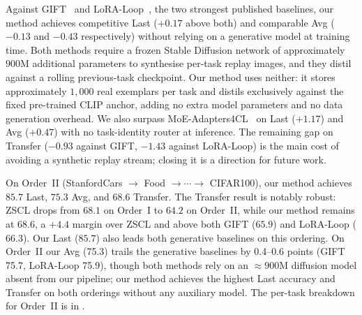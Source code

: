 \documentclass{article}
\begin{document}
  Against GIFT~\citep{gift2025} and LoRA-Loop~\citep{loraloop2025}, the two
  strongest published baselines, our method achieves competitive Last ($+0.17$
  above both) and comparable Avg ($-0.13$ and $-0.43$ respectively) without
  relying on a generative model at training time. Both methods require a frozen
  Stable Diffusion network of approximately $900$M additional parameters to
  synthesise per-task replay images, and they distil against a rolling
  previous-task checkpoint. Our method uses neither: it stores approximately
  $1{,}000$ real exemplars per task and distils exclusively against the fixed
  pre-trained CLIP anchor, adding no extra model parameters and no data generation
  overhead. We also surpass MoE-Adapters4CL~\citep{yu2024moe} on Last ($+1.17$)
  and Avg ($+0.47$) with no task-identity router at inference. The remaining gap
  on Transfer ($-0.93$ against GIFT, $-1.43$ against LoRA-Loop) is the main cost
  of avoiding a synthetic replay stream; closing it is a direction for future work.

  On Order~II (StanfordCars $\to$ Food $\to \cdots \to$ CIFAR100), our method
  achieves $85.7$ Last, $75.3$ Avg, and $68.6$ Transfer. The Transfer result is notably robust: ZSCL drops from $68.1$ on Order~I to $64.2$ on Order~II, while
  our method remains at $68.6$, a $+4.4$ margin over ZSCL and above both GIFT ($65.9$) and LoRA-Loop ($66.3$). Our Last ($85.7$) also leads both generative
  baselines on this ordering. On Order~II our Avg (75.3) trails the generative baselines by 0.4--0.6 points (GIFT 75.7, LoRA-Loop 75.9), though both methods rely on an ${\approx}900$M diffusion model absent from our pipeline; our method achieves the highest Last accuracy and Transfer on both orderings without any auxiliary model. The per-task breakdown for Order~II is in
  .
\end{document}
